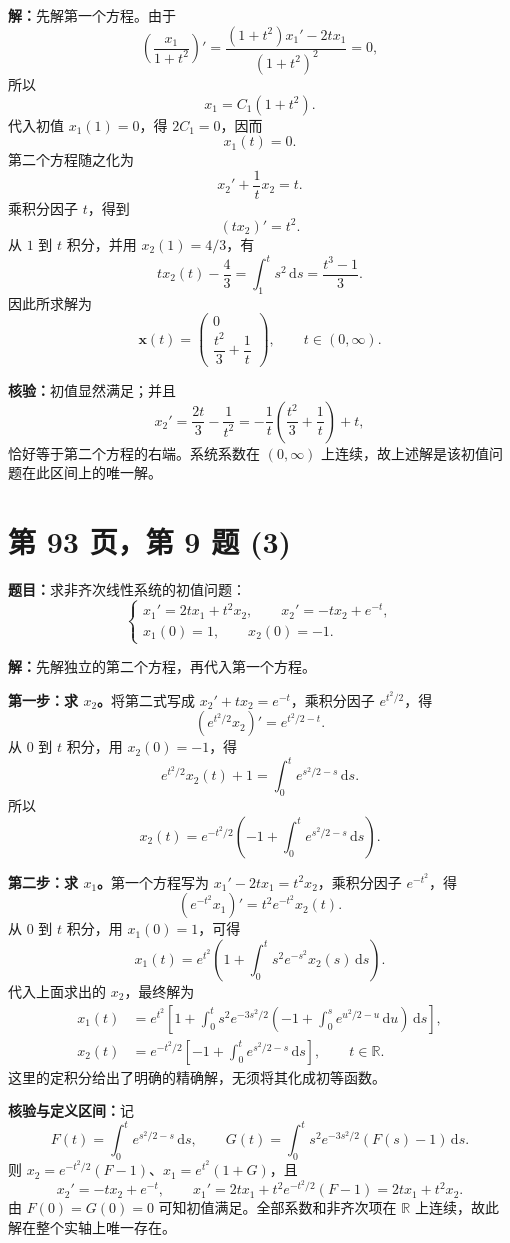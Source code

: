 \documentclass[11pt,a4paper]{ctexart}
\newcommand{\R}{\mathbb R}
\newcommand{\dd}{\,\mathrm d}
\newcommand{\xx}{\boldsymbol{x}}
\begin{document}
\textbf{解：}先解第一个方程。由于
\[
\left(\frac{x_1}{1+t^2}\right)'
=\frac{(1+t^2)x_1'-2tx_1}{(1+t^2)^2}=0,
\]
所以
\[
x_1=C_1(1+t^2).
\]
代入初值 $x_1(1)=0$，得 $2C_1=0$，因而
\[
\boxed{x_1(t)=0.}
\]
第二个方程随之化为
\[
x_2'+\frac1t x_2=t.
\]
乘积分因子 $t$，得到
\[
(tx_2)'=t^2.
\]
从 $1$ 到 $t$ 积分，并用 $x_2(1)=4/3$，有
\[
tx_2(t)-\frac43=\int_1^t s^2\dd s=\frac{t^3-1}{3}.
\]
因此所求解为
\[
\boxed{\xx(t)=\begin{pmatrix}0\\[2pt]\dfrac{t^2}{3}+\dfrac1t\end{pmatrix},
\qquad t\in(0,\infty).}
\]

\textbf{核验：}初值显然满足；并且
\[
x_2'=\frac{2t}{3}-\frac1{t^2}
=-\frac1t\left(\frac{t^2}{3}+\frac1t\right)+t,
\]
恰好等于第二个方程的右端。系统系数在 $(0,\infty)$ 上连续，故上述解是该初值问题在此区间上的唯一解。

\newpage
\section*{第 93 页，第 9 题 (3)}
\textbf{题目：}求非齐次线性系统的初值问题：
\[
\begin{cases}
x_1'=2tx_1+t^2x_2,\qquad x_2'=-tx_2+e^{-t},\\[3pt]
x_1(0)=1,\qquad x_2(0)=-1.
\end{cases}
\]

\textbf{解：}先解独立的第二个方程，再代入第一个方程。

\textbf{第一步：求 $x_2$。}将第二式写成 $x_2'+tx_2=e^{-t}$，乘积分因子 $e^{t^2/2}$，得
\[
\left(e^{t^2/2}x_2\right)'=e^{t^2/2-t}.
\]
从 $0$ 到 $t$ 积分，用 $x_2(0)=-1$，得
\[
e^{t^2/2}x_2(t)+1=\int_0^t e^{s^2/2-s}\dd s.
\]
所以
\[
\boxed{x_2(t)=e^{-t^2/2}\left(-1+\int_0^t e^{s^2/2-s}\dd s\right).}
\]

\textbf{第二步：求 $x_1$。}第一个方程写为 $x_1'-2tx_1=t^2x_2$，乘积分因子 $e^{-t^2}$，得
\[
(e^{-t^2}x_1)'=t^2e^{-t^2}x_2(t).
\]
从 $0$ 到 $t$ 积分，用 $x_1(0)=1$，可得
\[
x_1(t)=e^{t^2}\left(1+\int_0^t s^2e^{-s^2}x_2(s)\dd s\right).
\]
代入上面求出的 $x_2$，最终解为
\[
\boxed{\begin{aligned}
x_1(t)&=e^{t^2}\left[1+\int_0^t s^2e^{-3s^2/2}
\left(-1+\int_0^s e^{u^2/2-u}\dd u\right)\dd s\right],\\[5pt]
x_2(t)&=e^{-t^2/2}\left[-1+\int_0^t e^{s^2/2-s}\dd s\right],
\qquad t\in\R.
\end{aligned}}
\]
这里的定积分给出了明确的精确解，无须将其化成初等函数。

\textbf{核验与定义区间：}记
\[
F(t)=\int_0^t e^{s^2/2-s}\dd s,\qquad
G(t)=\int_0^t s^2e^{-3s^2/2}(F(s)-1)\dd s.
\]
则 $x_2=e^{-t^2/2}(F-1)$、$x_1=e^{t^2}(1+G)$，且
\[
x_2'=-tx_2+e^{-t},\qquad
x_1'=2tx_1+t^2e^{-t^2/2}(F-1)=2tx_1+t^2x_2.
\]
由 $F(0)=G(0)=0$ 可知初值满足。全部系数和非齐次项在 $\R$ 上连续，故此解在整个实轴上唯一存在。
\end{document}
